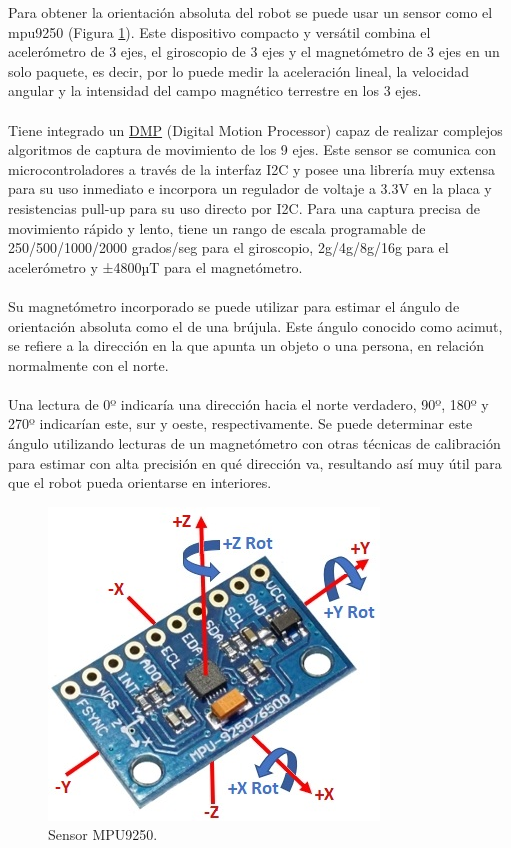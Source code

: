 Para obtener la orientación absoluta del robot se puede usar un sensor como el mpu9250 (Figura \ref{fig:mpu9250}). Este dispositivo compacto y versátil combina el acelerómetro de 3 ejes, el giroscopio de 3 ejes y el magnetómetro de 3 ejes en un solo paquete, es decir, por lo puede medir la aceleración lineal, la velocidad angular y la intensidad del campo magnético terrestre en los 3 ejes.\\ \\ Tiene integrado un \hyperlink{DMP}{DMP} (Digital Motion Processor) capaz de realizar complejos algoritmos de captura de movimiento de los 9 ejes. Este sensor se comunica con microcontroladores a través de la interfaz I2C y posee una librería muy extensa para su uso inmediato e incorpora un regulador de voltaje a 3.3V en la placa y resistencias pull-up para su uso directo por I2C. Para una captura precisa de movimiento rápido y lento, tiene un rango de escala programable de 250/500/1000/2000 grados/seg para el giroscopio, 2g/4g/8g/16g para el acelerómetro y ±4800µT para el magnetómetro.\\ \\
Su magnetómetro incorporado se puede utilizar para estimar el ángulo de orientación absoluta como el de una brújula. Este ángulo conocido como acimut, se refiere a la dirección en la que apunta un objeto o una persona, en relación normalmente con el norte.\\ \\ Una lectura de 0º indicaría una dirección hacia el norte verdadero, 90º, 180º y 270º indicarían este, sur y oeste, respectivamente. Se puede determinar este ángulo utilizando lecturas de un magnetómetro con otras técnicas de calibración para estimar con alta precisión en qué dirección va, resultando así muy útil para que el robot pueda orientarse en interiores.



\begin{figure}[H]
  \centering
  \includegraphics[scale=0.7]{figs/mpu9250} %
  \caption{Sensor MPU9250.}
  \label{fig:mpu9250}
\end{figure}


